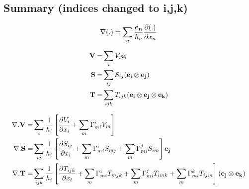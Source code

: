 \documentclass[11pt]{article}
\begin{document}
\subsection{Summary (indices changed to i,j,k)}

\begin{align}
\nabla (.) = \sum_n \frac{{\bf{e_n}}}{h_n}\frac{\partial (.)}{\partial x_n}
\end{align}

\begin{align}
{\bf{V}} = &  \sum_i V_i {\bf{{e_i}}} \\
{\bf{S}} = &  \sum_{ij} S_{ij} ({\bf{e_i}} \otimes {\bf{e_j}}) \\
{\bf{T}} = &  \sum_{ijk} T_{ijk} ({\bf{e_i}} \otimes {\bf{e_j}} \otimes {\bf{e_k}})
\end{align}

\begin{align}
\nabla . {\bf{V}} = & \sum_i \frac{1}{h_i} \left[ \frac{\partial V_i}{\partial x_i} + \sum_m \Gamma_{mi}^i V_m \right] \\
\nabla . {\bf{S}} = & \sum_{ij} \frac{1}{h_i} \left[ \frac{\partial S_{ij}}{\partial x_i} + \sum_m \Gamma_{mi}^i S_{mj} + \sum_m \Gamma_{mi}^j S_{im} \right] {\bf{e_j}} \\
\nabla . {\bf{T}} = & \sum_{ijk} \frac{1}{h_i} \left[ \frac{\partial T_{ijk}}{\partial x_i} + \sum_m \Gamma_{mi}^i T_{mjk} + \sum_m \Gamma_{mi}^j T_{imk} + \sum_m \Gamma_{mi}^k T_{ijm} \right]  ({\bf{e_j}} \otimes {\bf{e_k}})
\end{align}
\end{document}
